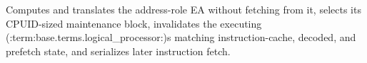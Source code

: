Computes and translates the address-role EA without fetching from it, selects its CPUID-sized maintenance block, invalidates the executing (:term:base.terms.logical_processor:)\textquotesingle{}s matching instruction-cache, decoded, and prefetch state, and serializes later instruction fetch.
